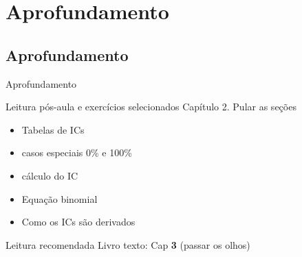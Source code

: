\documentclass{beamer}
\begin{document}
\section{Aprofundamento}

\subsection{Aprofundamento}

\begin{frame}{\scriptsize Aprofundamento}
  \begin{block}{Leitura pós-aula e exercícios selecionados}
    \footnotesize
    Capítulo 2. Pular as seções
    \begin{itemize}
      \scriptsize
    \item Tabelas de ICs
    \item casos especiais 0\% e 100\%
    \item cálculo do IC
    \item Equação binomial
    \item Como os ICs são derivados
    \end{itemize}
  \end{block}
  \begin{block}{Leitura recomendada}
    \scriptsize
    Livro texto: Cap {\bf 3} (passar os olhos)
  \end{block}
\end{frame}
\end{document}
